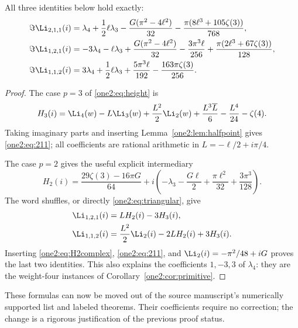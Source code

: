 \begin{theorem}
\label{one2:thm:triples}
All three identities below hold exactly:
\begin{align}
 \Im\Li_{2,1,1}(i)
 &=\lambda_4+\frac12\ell\lambda_3
       -\frac{G(\pi^2-4\ell^2)}{32}
       -\frac{\pi(8\ell^3+105\zeta(3))}{768},
       \label{one2:eq:211}\\
 \Im\Li_{1,2,1}(i)
 &=-3\lambda_4-\ell\lambda_3
       +\frac{G(\pi^2-4\ell^2)}{32}
       -\frac{3\pi^3\ell}{256}
       +\frac{\pi(2\ell^3+67\zeta(3))}{128},
       \label{one2:eq:121}\\
 \Im\Li_{1,1,2}(i)
 &=3\lambda_4+\frac12\ell\lambda_3
       +\frac{5\pi^3\ell}{192}
       -\frac{163\pi\zeta(3)}{256}.
       \label{one2:eq:112}
\end{align}
\end{theorem}
\begin{proof}
The case $p=3$ of \eqref{one2:eq:height} is
\begin{equation}
 H_3(i)=\Li_4(w)-L\Li_3(w)+\frac{L^2}{2}\Li_2(w)
        +\frac{L^3\overline L}{6}-\frac{L^4}{24}-\zeta(4).
 \label{one2:eq:H3complex}
\end{equation}
Taking imaginary parts and inserting Lemma~\ref{one2:lem:halfpoint}
gives \eqref{one2:eq:211}; all coefficients are rational arithmetic
in $L=-\ell/2+i\pi/4$.

The case $p=2$ gives the useful explicit intermediary
\begin{equation}
 H_2(i)=\frac{29\zeta(3)-16\pi G}{64}
       +i\left(-\lambda_3-\frac{G\ell}{2}
                    +\frac{\pi\ell^2}{32}+\frac{3\pi^3}{128}\right).
 \label{one2:eq:H2complex}
\end{equation}
The word shuffles, or directly \eqref{one2:eq:triangular}, give
\begin{align*}
 \Li_{1,2,1}(i)&=LH_2(i)-3H_3(i),\\
 \Li_{1,1,2}(i)&=\frac{L^2}{2}\Li_2(i)-2LH_2(i)+3H_3(i).
\end{align*}
Inserting \eqref{one2:eq:H2complex}, \eqref{one2:eq:211}, and
$\Li_2(i)=-\pi^2/48+iG$ proves the last two identities.  This also
explains the coefficients $1,-3,3$ of $\lambda_4$: they are the
weight-four instances of Corollary~\ref{one2:cor:primitive}.
\end{proof}

These formulas can now be moved out of the source manuscript's
numerically supported list and labeled theorems.  Their coefficients
require no correction; the change is a rigorous justification of the
previous proof status.

